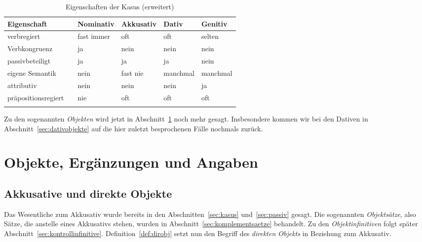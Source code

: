 \begin{table}[!htbp]
  \begin{tabular}{lp{0.1cm}llll}
    \lsptoprule
     \textbf{Eigenschaft} && \textbf{Nominativ} & \textbf{Akkusativ} & \textbf{Dativ} & \textbf{Genitiv} \\
    \hline
    verbregiert && fast immer & oft & oft & selten \\
    Verbkongruenz && ja & nein & nein & nein \\
    passivbeteiligt && ja & ja & ja & nein \\
    eigene Semantik && nein & fast nie & manchmal & manchmal \\
    attributiv && nein & nein & nein & ja \\
    präpositionsregiert && nie & oft & oft & oft \\
    \lspbottomrule
  \end{tabular}
  \caption{Eigenschaften der Kasus (erweitert)}
  \label{tab:eigenschaftenderkasuserweitert}
\end{table}

Zu den sogenannten \textit{Objekten} wird jetzt in Abschnitt~\ref{sec:objekte} noch mehr gesagt.
Insbesondere kommen wir bei den Dativen in Abschnitt~\ref{sec:dativobjekte} auf die hier zuletzt besprochenen Fälle nochmals zurück.




\section{Objekte, Ergänzungen und Angaben}

\label{sec:objekte}

\subsection{Akkusative und direkte Objekte}


Das Wesentliche zum Akkusativ wurde bereits in den Abschnitten~\ref{sec:kasus} und~\ref{sec:passiv} gesagt.
Die sogenannten \textit{Objektsätze}, also Sätze, die anstelle eines Akkusativs stehen, wurden in Abschnitt~\ref{sec:komplementsaetze} behandelt.
Zu den \textit{Objektinfinitiven} folgt später Abschnitt~\ref{sec:kontrollinfinitive}.
Definition~\ref{def:dirobj} setzt nun den Begriff des \textit{direkten Objekts} in Beziehung zum Akkusativ.

